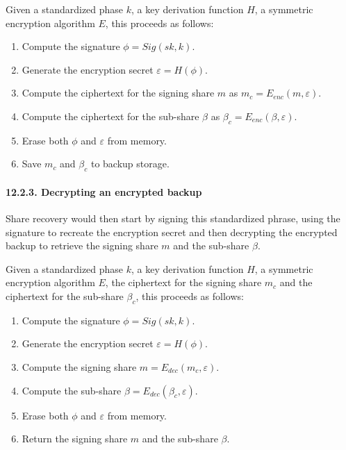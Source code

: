 \documentclass[
]{article}
\providecommand{\tightlist}{%
  \setlength{\itemsep}{0pt}\setlength{\parskip}{0pt}}
\begin{document}
Given a standardized phase \(k\), a key derivation function \(H\), a
symmetric encryption algorithm \(E\), this proceeds as follows:

\begin{enumerate}
\def\labelenumi{\arabic{enumi}.}
\tightlist
\item
  Compute the signature \(\phi = Sig(sk, k)\).
\item
  Generate the encryption secret \(\varepsilon = H(\phi)\).
\item
  Compute the ciphertext for the signing share \(m\) as
  \(m_c = E_{enc}(m, \varepsilon)\).
\item
  Compute the ciphertext for the sub-share \(\beta\) as
  \(\beta _c = E_{enc}(\beta, \varepsilon)\).
\item
  Erase both \(\phi\) and \(\varepsilon\) from memory.
\item
  Save \(m_c\) and \(\beta _c\) to backup storage.
\end{enumerate}

\hypertarget{share-recovery-backup-decrypted}{%
\paragraph{12.2.3. Decrypting an encrypted
backup}\label{share-recovery-backup-decrypted}}

Share recovery would then start by signing this standardized phrase,
using the signature to recreate the encryption secret and then
decrypting the encrypted backup to retrieve the signing share \(m\) and
the sub-share \(\beta\).

Given a standardized phase \(k\), a key derivation function \(H\), a
symmetric encryption algorithm \(E\), the ciphertext for the signing
share \(m_c\) and the ciphertext for the sub-share \(\beta _c\), this
proceeds as follows:

\begin{enumerate}
\def\labelenumi{\arabic{enumi}.}
\tightlist
\item
  Compute the signature \(\phi = Sig(sk, k)\).
\item
  Generate the encryption secret \(\varepsilon = H(\phi)\).
\item
  Compute the signing share \(m = E_{dec}(m_c, \varepsilon)\).
\item
  Compute the sub-share \(\beta = E_{dec}(\beta _c, \varepsilon)\).
\item
  Erase both \(\phi\) and \(\varepsilon\) from memory.
\item
  Return the signing share \(m\) and the sub-share \(\beta\).
\end{enumerate}
\end{document}
